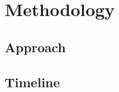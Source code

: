 \documentclass{article}
\begin{document}
\section{Methodology}
\label{sec:methodology}

\subsection{Approach}
\label{subsec:approach}

\subsection{Timeline}
\label{subsec:timeline}

\nocite{pixel_cnn}



\end{document}
